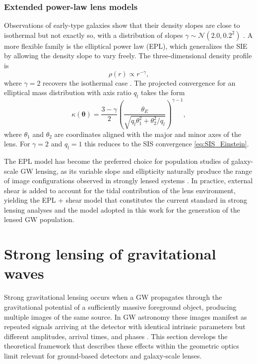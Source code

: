 \subsubsection{Extended power-law lens models}

Observations of early-type galaxies show that their density 
slopes are close to isothermal but not exactly so, with a 
distribution of slopes $\gamma \sim \mathcal{N}(2.0, 0.2^2)$ 
\cite{EPL_lensing}. A more flexible family is the elliptical power law (EPL), which generalizes the SIE by allowing the density slope to vary freely. The three-dimensional density profile is
\begin{equation}
    \rho(r) \propto r^{-\gamma},
\end{equation}
where $\gamma = 2$ recovers the isothermal case \cite{EPLmodel}. The projected convergence for an elliptical mass distribution with axis ratio $q_l$ takes the form
\begin{equation}
    \kappa(\boldsymbol{\theta}) = 
    \frac{3-\gamma}{2}
    \left(\frac{\theta_E}{\sqrt{q_l\theta_1^2 + 
    \theta_2^2/q_l}}\right)^{\gamma-1},
\end{equation}
where $\theta_1$ and $\theta_2$ are coordinates aligned with 
the major and minor axes of the lens. For $\gamma = 2$ and 
$q_l = 1$ this reduces to the SIS convergence 
\eqref{eq:SIS_Einstein}.

The EPL model has become the preferred choice for population studies of galaxy-scale GW lensing, as its variable slope and ellipticity naturally produce the range of image configurations observed in strongly lensed systems \cite{EPL_standard}. In practice, external shear is added to account for the tidal contribution of the lens environment, yielding the EPL + shear model that constitutes the current standard in strong lensing analyses \cite{EPL_plus_shear} and the model adopted in this work for the generation of the lensed GW population.




\section{Strong lensing of gravitational waves}
\label{sec:strong_lensing}

Strong gravitational lensing occurs when a GW propagates 
through the gravitational potential of a sufficiently massive foreground object, producing multiple images of the same source. In GW astronomy these images manifest as repeated signals arriving at the detector with identical intrinsic parameters but different amplitudes, arrival times, and phases \cite{Lensing_phase_effects}. This section develops the theoretical framework that describes these effects within the geometric optics limit relevant for ground-based detectors and galaxy-scale lenses.

